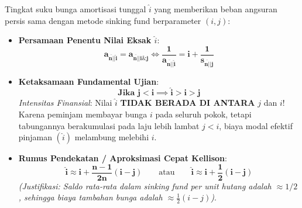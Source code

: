 \documentclass[10pt,a4paper]{article}
\newcommand{\angl}[1]{\overline{#1|}}
\begin{document}
\begin{teoremabox}
Tingkat suku bunga amortisasi tunggal $\hat{i}$ yang memberikan beban angsuran persis sama dengan metode sinking fund berparameter $(i, j)$:
\begin{itemize}[leftmargin=1.5em, topsep=1.5pt, itemsep=2pt]
    \item \textbf{Persamaan Penentu Nilai Eksak $\hat{i}$}:
    \begin{equation*}
        \mathbf{a_{\angl{n}|\hat{i}} = a_{\angl{n}|i \& j}} \iff \mathbf{\frac{1}{a_{\angl{n}|\hat{i}}} = i + \frac{1}{s_{\angl{n}|j}}}
    \end{equation*}
    \item \textbf{Ketaksamaan Fundamental Ujian}:
    \begin{equation*}
        \mathbf{\text{Jika } j < i \implies \hat{i} > i > j}
    \end{equation*}
    \textit{Intensitas Finansial}: Nilai $\hat{i}$ \textbf{TIDAK BERADA DI ANTARA} $j$ dan $i$! Karena peminjam membayar bunga $i$ pada seluruh pokok, tetapi tabungannya berakumulasi pada laju lebih lambat $j < i$, biaya modal efektif pinjaman $(\hat{i})$ melambung melebihi $i$.
    \item \textbf{Rumus Pendekatan / Aproksimasi Cepat Kellison}:
    \begin{equation*}
        \mathbf{\hat{i} \approx i + \frac{n-1}{2n} (i - j)} \qquad\text{atau}\qquad \mathbf{\hat{i} \approx i + \frac{1}{2}(i - j)}
    \end{equation*}
    \textit{(Justifikasi: Saldo rata-rata dalam sinking fund per unit hutang adalah $\approx 1/2$, sehingga biaya tambahan bunga adalah $\approx \frac{1}{2}(i - j)$)}.
\end{itemize}
\end{teoremabox}
\end{document}
